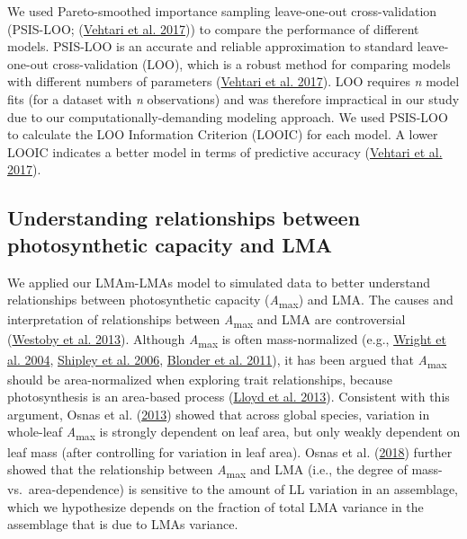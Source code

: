 \documentclass[
  12pt,
  letterpaper,
  DIV=11,
  numbers=noendperiod]{scrartcl}
\begin{document}
We used Pareto-smoothed importance sampling leave-one-out
cross-validation (PSIS-LOO; (\protect\hyperlink{ref-Vehtari2017}{Vehtari
et al. 2017})) to compare the performance of different models. PSIS-LOO
is an accurate and reliable approximation to standard leave-one-out
cross-validation (LOO), which is a robust method for comparing models
with different numbers of parameters
(\protect\hyperlink{ref-Vehtari2017}{Vehtari et al. 2017}). LOO requires
\emph{n} model fits (for a dataset with \emph{n} observations) and was
therefore impractical in our study due to our computationally-demanding
modeling approach. We used PSIS-LOO to calculate the LOO Information
Criterion (LOOIC) for each model. A lower LOOIC indicates a better model
in terms of predictive accuracy
(\protect\hyperlink{ref-Vehtari2017}{Vehtari et al. 2017}).

\hypertarget{understanding-relationships-between-photosynthetic-capacity-and-lma}{%
\subsection{Understanding relationships between photosynthetic capacity
and
LMA}\label{understanding-relationships-between-photosynthetic-capacity-and-lma}}

We applied our LMAm-LMAs model to simulated data to better understand
relationships between photosynthetic capacity
(\emph{A}\textsubscript{max}) and LMA. The causes and interpretation of
relationships between \emph{A}\textsubscript{max} and LMA are
controversial (\protect\hyperlink{ref-Westoby2013}{Westoby et al.
2013}). Although \emph{A}\textsubscript{max} is often mass-normalized
(e.g., \protect\hyperlink{ref-Wright2004a}{Wright et al. 2004},
\protect\hyperlink{ref-Shipley2006}{Shipley et al. 2006},
\protect\hyperlink{ref-Blonder2011}{Blonder et al. 2011}), it has been
argued that \emph{A}\textsubscript{max} should be area-normalized when
exploring trait relationships, because photosynthesis is an area-based
process (\protect\hyperlink{ref-Lloyd2013}{Lloyd et al. 2013}).
Consistent with this argument, Osnas et al.
(\protect\hyperlink{ref-Osnas2013}{2013}) showed that across global
species, variation in whole-leaf \emph{A}\textsubscript{max} is strongly
dependent on leaf area, but only weakly dependent on leaf mass (after
controlling for variation in leaf area). Osnas et al.
(\protect\hyperlink{ref-Osnas2018}{2018}) further showed that the
relationship between \emph{A}\textsubscript{max} and LMA (i.e., the
degree of mass- vs.~area-dependence) is sensitive to the amount of LL
variation in an assemblage, which we hypothesize depends on the fraction
of total LMA variance in the assemblage that is due to LMAs variance.
\end{document}
